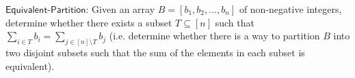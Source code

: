 $\mathsf{Equivalent \text{-} Partition}$: Given an array \(B=[b_1,b_2,...,b_n]\) of non-negative integers, determine whether there exists a subset $T \subseteq [n]$ such that $\sum_{i\in T} b_i = \sum_{j \in [n] \setminus T} b_j $ (i.e. determine whether there is a way to partition $B$ into two disjoint subsets such that the sum of the elements in each subset is equivalent). 
\newpage
{}
